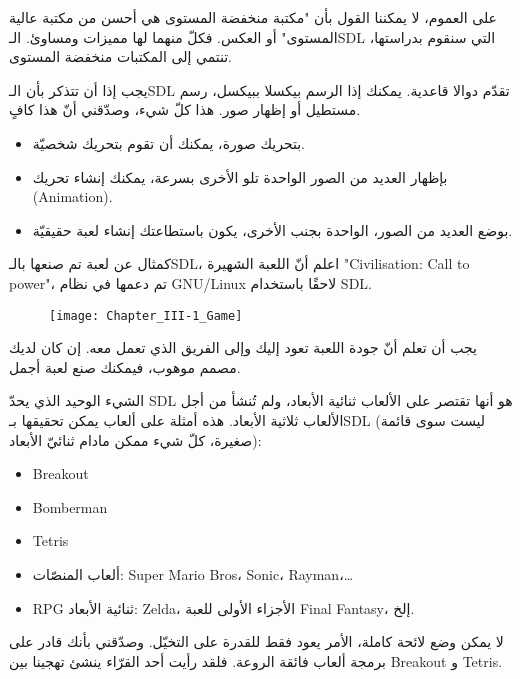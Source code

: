 على العموم، لا يمكننا القول بأن "مكتبة منخفضة المستوى هي أحسن من مكتبة عالية المستوى" أو العكس. فكلّ منهما لها مميزات ومساوئ. الـ\textenglish{SDL}
التي سنقوم بدراستها، تنتمي إلى المكتبات منخفضة المستوى.

يجب إذا أن تتذكر بأن الـ\textenglish{SDL}
تقدّم دوالا قاعدية. يمكنك إذا الرسم بيكسلا ببيكسل، رسم مستطيل أو إظهار صور. هذا كلّ شيء، وصدّقني أنّ هذا كافٍ.

\begin{itemize}
	\item بتحريك صورة، يمكنك أن تقوم بتحريك شخصيّة.
	\item بإظهار العديد من الصور الواحدة تلو الأخرى بسرعة، يمكنك إنشاء تحريك
	(\textenglish{Animation}).
	\item بوضع العديد من الصور، الواحدة بجنب الأخرى، يكون باستطاعتك إنشاء لعبة حقيقيّة.
\end{itemize}

كمثال عن لعبة تم صنعها بالـ\textenglish{SDL}،
اعلم أنّ اللعبة الشهيرة
"\textenglish{Civilisation: Call to power}"،
تم دعمها في نظام 
\textenglish{GNU/Linux}
لاحقًا باستخدام \textenglish{SDL}.

\begin{figure}[H]
	\centering
	\texttt{[image: Chapter\_III-1\_Game]}
\end{figure}

يجب أن تعلم أنّ جودة اللعبة تعود إليك وإلى الفريق الذي تعمل معه. إن كان لديك مصمم موهوب، فيمكنك صنع لعبة أجمل.

الشيء الوحيد الذي يحدّ \textenglish{SDL}
هو أنها تقتصر على الألعاب ثنائية الأبعاد، ولم تُنشأ من أجل الألعاب ثلاثية الأبعاد. هذه أمثلة على ألعاب يمكن تحقيقها بـ\textenglish{SDL}
(ليست سوى قائمة صغيرة، كلّ شيء ممكن مادام ثنائيّ الأبعاد):

\begin{itemize}
	\item \textenglish{Breakout}
	\item \textenglish{Bomberman}
	\item \textenglish{Tetris}
	\item ألعاب المنصّات:
	\textenglish{Super Mario Bros}، \textenglish{Sonic}، \textenglish{Rayman}،\dots
	\item \textenglish{RPG} ثنائية الأبعاد:
	\textenglish{Zelda}،
	الأجزاء الأولى للعبة
	\textenglish{Final Fantasy}،
	إلخ.
\end{itemize}
لا يمكن وضع لائحة كاملة، الأمر يعود فقط للقدرة على التخيّل. وصدّقني بأنك قادر على برمجة ألعاب فائقة الروعة. فلقد رأيت أحد القرّاء ينشئ تهجينا بين
\textenglish{Breakout}
و
\textenglish{Tetris}.

